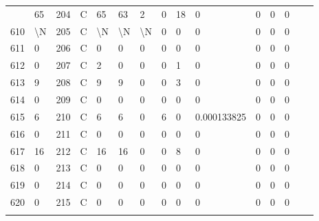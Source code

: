 \begin{longtable}{lllllllllllllll}
\begin{comment}
	609 & 65                & 204 & C   & 65                & 63                & 2                 & 0    & 18         & 0              & 0              & 0             & 0            \\
	610 & \textbackslash{}N & 205 & C   & \textbackslash{}N & \textbackslash{}N & \textbackslash{}N & 0    & 0          & 0              & 0              & 0             & 0            \\
	611 & 0                 & 206 & C   & 0                 & 0                 & 0                 & 0    & 0          & 0              & 0              & 0             & 0            \\
	612 & 0                 & 207 & C   & 2                 & 0                 & 0                 & 0    & 1          & 0              & 0              & 0             & 0            \\
	613 & 9                 & 208 & C   & 9                 & 9                 & 0                 & 0    & 3          & 0              & 0              & 0             & 0            \\
	614 & 0                 & 209 & C   & 0                 & 0                 & 0                 & 0    & 0          & 0              & 0              & 0             & 0            \\
	615 & 6                 & 210 & C   & 6                 & 6                 & 0                 & 6    & 0          & 0.000133825    & 0              & 0             & 0            \\
	616 & 0                 & 211 & C   & 0                 & 0                 & 0                 & 0    & 0          & 0              & 0              & 0             & 0            \\
	617 & 16                & 212 & C   & 16                & 16                & 0                 & 0    & 8          & 0              & 0              & 0             & 0            \\
	618 & 0                 & 213 & C   & 0                 & 0                 & 0                 & 0    & 0          & 0              & 0              & 0             & 0            \\
	619 & 0                 & 214 & C   & 0                 & 0                 & 0                 & 0    & 0          & 0              & 0              & 0             & 0            \\
	620 & 0                 & 215 & C   & 0                 & 0                 & 0                 & 0    & 0          & 0              & 0              & 0             & 0            \\

\end{comment}
\end{longtable}

